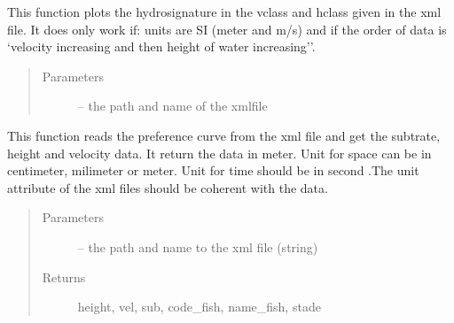 \documentclass[letterpaper,10pt,english]{sphinxmanual}
\begin{document}

\begin{fulllineitems}
\label{\detokenize{index:src.bio_info.plot_hydrosignature}}
This function plots the hydrosignature in the vclass and hclass given in the xml file.
It does only work if: units are SI (meter and m/s) and if the order of data is `velocity increasing
and then height of water increasing''.
\begin{quote}\begin{description}
\item[{Parameters}] \leavevmode
{} -- the path and name of the xmlfile

\end{description}\end{quote}

\end{fulllineitems}


\begin{fulllineitems}
\label{\detokenize{index:src.bio_info.read_pref}}
This function reads the preference curve from the xml file and get the subtrate, height and velocity data.
It return the data in meter. Unit for space can be in centimeter, milimeter or meter. Unit for time should be in
second .The unit attribute of the xml files should be coherent with the data.
\begin{quote}\begin{description}
\item[{Parameters}] \leavevmode
{} -- the path and name to the xml file (string)

\item[{Returns}] \leavevmode
height, vel, sub, code\_fish, name\_fish, stade

\end{description}\end{quote}

\end{fulllineitems}

\end{document}

